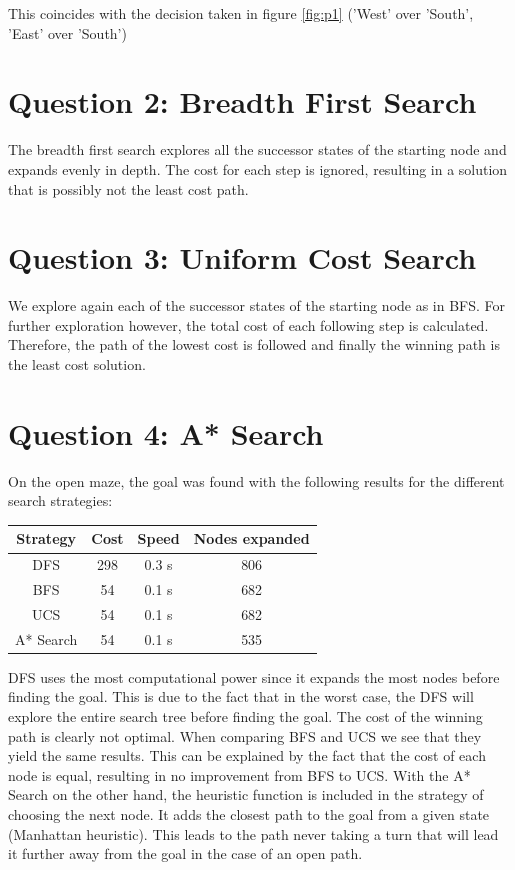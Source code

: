 \documentclass[onecolumn]{article}
\begin{document}
	This coincides with the decision taken in figure \ref{fig:p1} ('West' over 'South', 'East' over 'South')
		
	\section{Question 2: Breadth First Search}
	The breadth first search explores all the successor states of the starting node and expands evenly in depth. The cost for each step is ignored, resulting in a solution that is possibly not the least cost path.
	
		
	\section{Question 3: Uniform Cost Search}
	
	We explore again each of the successor states of the starting node as in BFS. For further exploration however, the total cost of each following step is calculated. Therefore, the path of the lowest cost is followed and finally the winning path is the least cost solution. 
	
		
	\section{Question 4: A* Search}
	On the open maze, the goal was found with the following results for the different search strategies:
	
	\begin{tabular}{|c|c|c|c|}
		\hline
		Strategy & Cost & Speed & Nodes expanded \\ \hline\hline 
		DFS & 298 & 0.3 s & 806 \\  				\hline
		BFS & 54 & 0.1 s & 682 \\ 					\hline
		UCS & 54 & 0.1 s & 682 \\ 					\hline
		A* Search & 54 & 0.1 s & 535\\ 				\hline
	\end{tabular} 
	\newline\newline
	DFS uses the most computational power since it expands the most nodes before finding the goal. This is due to the fact that in the worst case, the DFS will explore the entire search tree before finding the goal. The cost of the winning path is clearly not optimal.\newline
	When comparing BFS and UCS we see that they yield the same results. This can be explained by the fact that the cost of each node is equal, resulting in no improvement from BFS to UCS. With the A* Search on the other hand, the heuristic function is included in the strategy of choosing the next node. It adds the closest path to the goal from a given state (Manhattan heuristic). This leads to the path never taking a turn that will lead it further away from the goal in the case of an open path.
	
\end{document}

